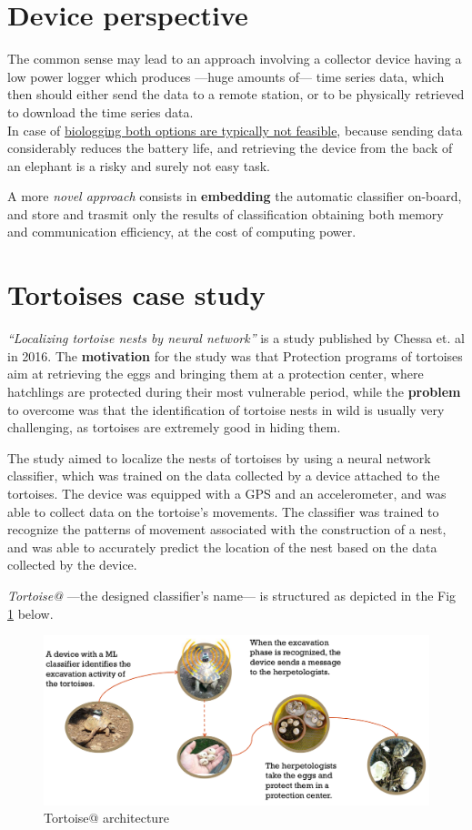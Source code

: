 \section{Device perspective}
The common sense may lead to an approach involving a  collector device having a low power logger which produces ---huge amounts of--- time series data, which then should either send the data to a remote station, or to be physically retrieved to download the time series data.\\
In case of \ul{biologging both options are typically not feasible}, because sending data considerably reduces the battery life, and retrieving the device from the back of an elephant is a risky and surely not easy task. \smiley

A more \textit{novel approach} consists in \textbf{embedding} the automatic classifier on-board, and store and trasmit only the results of classification obtaining both memory and communication efficiency, at the cost of computing power.

\section{Tortoises case study}

\textit{``Localizing tortoise nests by neural network''} is a study published by Chessa et. al in 2016.
The \textbf{motivation} for the study was that Protection programs of tortoises aim at retrieving the eggs and bringing them at a protection center, where hatchlings are protected during their most vulnerable period, while the \textbf{problem} to overcome was that the identification of tortoise nests in wild is usually very challenging, as tortoises are extremely good in hiding them.

The study aimed to localize the nests of tortoises by using a neural network classifier, which was trained on the data collected by a device attached to the tortoises. The device was equipped with a GPS and an accelerometer, and was able to collect data on the tortoise's movements. The classifier was trained to recognize the patterns of movement associated with the construction of a nest, and was able to accurately predict the location of the nest based on the data collected by the device.

\textit{Tortoise@} ---the designed classifier's name--- is structured as depicted in the Fig \ref{fig:tortoise_architecture} below.
\begin{figure}[htbp]
   \centering
   \includegraphics{images/tortoise@_architecture.png}
   \caption{Tortoise@ architecture}
   \label{fig:tortoise_architecture}
\end{figure}

